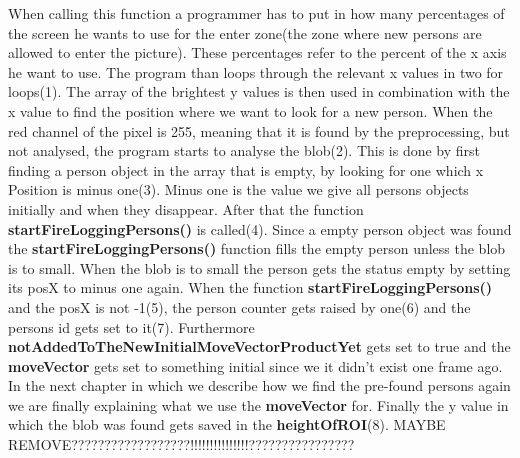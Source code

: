 When calling this function a programmer has to put in how many percentages of the screen he wants to use for the enter zone(the zone where new persons are allowed to enter the picture). These percentages refer to the percent of the x axis he want to use. The program than loops through the relevant x values in two for loops(1). The array of the brightest y values is then used in combination with the x value to find the position where we want to look for a new person. When the red channel of the pixel is 255, meaning that it is found by the preprocessing, but not analysed, the program starts to analyse the blob(2). This is done by first finding a person object in the array that is empty, by looking for one which x Position is minus one(3). Minus one is the value we give all persons objects initially and when they disappear. After that the function \textbf{startFireLoggingPersons()} is called(4). Since a empty person object was found the \textbf{startFireLoggingPersons()} function fills the empty person unless the blob is to small. When the blob is to small the person gets the status empty by setting its  posX to minus one again. 
When the function \textbf{startFireLoggingPersons()} and the posX is not -1(5), the person counter gets raised by one(6) and the persons id gets set to it(7). Furthermore \textbf{notAddedToTheNewInitialMoveVectorProductYet} gets set to true and  the \textbf{moveVector} gets set to something initial since we it didn't exist one frame ago. In the next chapter in which we describe how we find the pre-found persons again we are finally explaining what we use the \textbf{moveVector} for.
Finally the y value in which the blob was found gets saved in the \textbf{heightOfROI}(8).
MAYBE REMOVE??????????????????!!!!!!!!!!!!!!!????????????????

